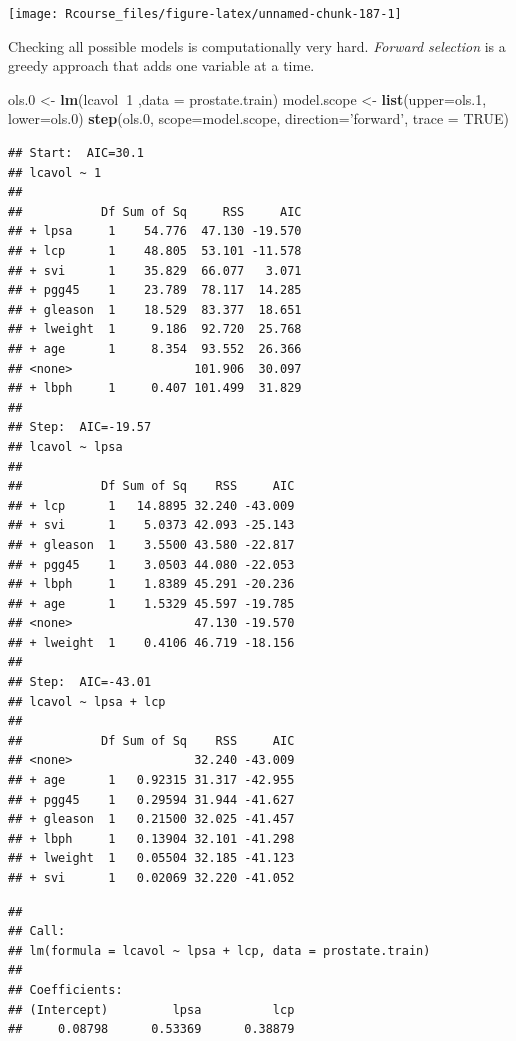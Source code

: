\documentclass[]{book}
\newenvironment{Shaded}{\begin{snugshade}}{\end{snugshade}}
\newcommand{\KeywordTok}[1]{\textcolor[rgb]{0.13,0.29,0.53}{\textbf{#1}}}
\newcommand{\DataTypeTok}[1]{\textcolor[rgb]{0.13,0.29,0.53}{#1}}
\newcommand{\DecValTok}[1]{\textcolor[rgb]{0.00,0.00,0.81}{#1}}
\newcommand{\StringTok}[1]{\textcolor[rgb]{0.31,0.60,0.02}{#1}}
\newcommand{\OtherTok}[1]{\textcolor[rgb]{0.56,0.35,0.01}{#1}}
\newcommand{\OperatorTok}[1]{\textcolor[rgb]{0.81,0.36,0.00}{\textbf{#1}}}
\newcommand{\NormalTok}[1]{#1}
\theoremstyle{definition}
\theoremstyle{definition}
\theoremstyle{definition}
\theoremstyle{remark}
\begin{document}
\texttt{[image: Rcourse\_files/figure-latex/unnamed-chunk-187-1]}

Checking all possible models is computationally very hard. \emph{Forward
selection} is a greedy approach that adds one variable at a time.

\begin{Shaded}
\begin{Highlighting}[]
\NormalTok{ols.}\DecValTok{0}\NormalTok{ <-}\StringTok{ }\KeywordTok{lm}\NormalTok{(lcavol}\OperatorTok{~}\DecValTok{1}\NormalTok{ ,}\DataTypeTok{data =}\NormalTok{ prostate.train)}
\NormalTok{model.scope <-}\StringTok{ }\KeywordTok{list}\NormalTok{(}\DataTypeTok{upper=}\NormalTok{ols.}\DecValTok{1}\NormalTok{, }\DataTypeTok{lower=}\NormalTok{ols.}\DecValTok{0}\NormalTok{)}
\KeywordTok{step}\NormalTok{(ols.}\DecValTok{0}\NormalTok{, }\DataTypeTok{scope=}\NormalTok{model.scope, }\DataTypeTok{direction=}\StringTok{'forward'}\NormalTok{, }\DataTypeTok{trace =} \OtherTok{TRUE}\NormalTok{)}
\end{Highlighting}
\end{Shaded}

\begin{verbatim}
## Start:  AIC=30.1
## lcavol ~ 1
## 
##           Df Sum of Sq     RSS     AIC
## + lpsa     1    54.776  47.130 -19.570
## + lcp      1    48.805  53.101 -11.578
## + svi      1    35.829  66.077   3.071
## + pgg45    1    23.789  78.117  14.285
## + gleason  1    18.529  83.377  18.651
## + lweight  1     9.186  92.720  25.768
## + age      1     8.354  93.552  26.366
## <none>                 101.906  30.097
## + lbph     1     0.407 101.499  31.829
## 
## Step:  AIC=-19.57
## lcavol ~ lpsa
## 
##           Df Sum of Sq    RSS     AIC
## + lcp      1   14.8895 32.240 -43.009
## + svi      1    5.0373 42.093 -25.143
## + gleason  1    3.5500 43.580 -22.817
## + pgg45    1    3.0503 44.080 -22.053
## + lbph     1    1.8389 45.291 -20.236
## + age      1    1.5329 45.597 -19.785
## <none>                 47.130 -19.570
## + lweight  1    0.4106 46.719 -18.156
## 
## Step:  AIC=-43.01
## lcavol ~ lpsa + lcp
## 
##           Df Sum of Sq    RSS     AIC
## <none>                 32.240 -43.009
## + age      1   0.92315 31.317 -42.955
## + pgg45    1   0.29594 31.944 -41.627
## + gleason  1   0.21500 32.025 -41.457
## + lbph     1   0.13904 32.101 -41.298
## + lweight  1   0.05504 32.185 -41.123
## + svi      1   0.02069 32.220 -41.052
\end{verbatim}

\begin{verbatim}
## 
## Call:
## lm(formula = lcavol ~ lpsa + lcp, data = prostate.train)
## 
## Coefficients:
## (Intercept)         lpsa          lcp  
##     0.08798      0.53369      0.38879
\end{verbatim}
\end{document}
